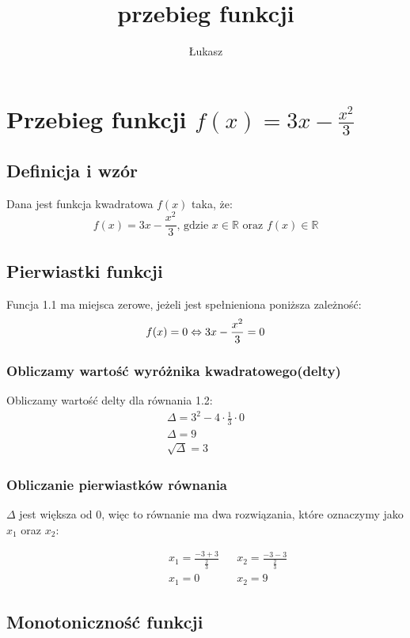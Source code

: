 \documentclass[12pt,twoside,a4]{mwbk}
\author{Łukasz}
\title{przebieg funkcji}
\begin{document}
\chapter{Przebieg funkcji $f(x) = 3x - \frac{x^2}{3}$}
		\section{Definicja i wzór}
			Dana jest funkcja kwadratowa $f(x)$ taka, że: \\
		
		\begin{equation}
			f(x)=3x - \frac{x^2}{3}\text{, gdzie } x\in\mathbb{R}\text{ oraz } f(x)\in\mathbb{R}
		\end{equation}
		
		\section{Pierwiastki funkcji}
		Funcja 1.1 ma miejsca zerowe, jeżeli jest spełnieniona poniższa zależność:
		\begin{equation}
			f(x) = 0  \Leftrightarrow 3x - \frac{x^2}{3}=0\\
		\end{equation}
		\subsection{Obliczamy wartość wyróżnika kwadratowego(delty)}
		Obliczamy wartość delty dla równania 1.2:
		\begin{gather*}
			\Delta = 3^2-4\cdot\frac{1}{3}\cdot0\\
			\Delta = 9\\ 
			\sqrt\Delta = 3
		\end{gather*}
		\subsection{Obliczanie pierwiastków równania}
		\begin{center}
			$\Delta$ jest większa od 0, więc to równanie ma dwa rozwiązania, które oznaczymy jako $x_1$ oraz $x_2$:
		\end{center}
		\begin{align*}
			\qquad\qquad&x_1 = \frac{-3+3}{\frac{2}{3}}& &x_2 = \frac{-3-3}{\frac{2}{3}}&\\
			\qquad\qquad&x_1 = 0& &x_2 = 9&
		\end{align*}
		
		
		\section{Monotoniczność funkcji}
\end{document}

